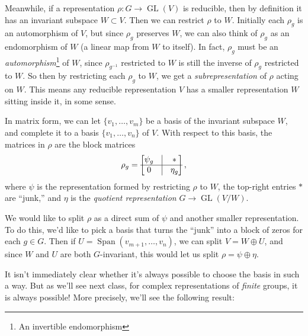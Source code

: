 Meanwhile, if a representation $\rho: G \to \operatorname{GL}(V)$ is reducible, then by definition it has an invariant subspace $W \subset V$. Then we can restrict $\rho$ to $W$. Initially each $\rho_g$ is an automorphism of $V$, but since $\rho_g$ preserves $W$, we can also think of $\rho_g$ as an endomorphism of $W$ (a linear map from $W$ to itself). In fact, $\rho_g$ must be an \emph{automorphism}\footnote{An invertible endomorphism} of $W$, since $\rho_{g^{-1}}$ restricted to $W$ is still the inverse of $\rho_g$ restricted to $W$. So then by restricting each $\rho_g$ to $W$, we get a \emph{subrepresentation} of $\rho$ acting on $W$. This means any reducible representation $V$ has a smaller representation $W$ sitting inside it, in some sense. 


In matrix form, we can let $\{v_1, \ldots, v_m\}$ be a basis of the invariant subspace $W$, and complete it to a basis $\{v_1, \ldots, v_n\}$ of $V$. With respect to this basis, the matrices in $\rho$ are the block matrices \[\rho_g = \begin{bmatrix} \psi_g & \vline & * \\ \hline 0 & \vline & \eta_g \end{bmatrix},\] where $\psi$ is the representation formed by restricting $\rho$ to $W$, the top-right entries $*$ are ``junk,'' and $\eta$ is the \emph{quotient representation} $G \to \operatorname{GL}(V/W)$. 

We would like to split $\rho$ as a direct sum of $\psi$ and another smaller representation. To do this, we'd like to pick a basis that turns the ``junk'' into a block of zeros for each $g \in G$. Then if $U = \operatorname{Span}(v_{m + 1}, \ldots, v_n)$, we can split $V = W \oplus U$, and since $W$ and $U$ are both $G$-invariant, this would let us split $\rho = \psi \oplus \eta$. 

It isn't immediately clear whether it's always possible to choose the basis in such a way. But as we'll see next class, for complex representations of \emph{finite} groups, it is always possible! More precisely, we'll see the following result: 

